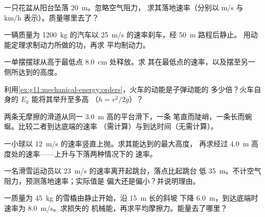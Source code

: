 \begin{exercise}[$\star$]\label{exo:g11:mechanical-energy:3}
一只花盆从阳台坠落 \qty{20}{m}。忽略空气阻力，
求其落地速率（分别以 \unit{m/s} 与 \unit{km/h} 表示）。质量哪里去了？
\end{exercise}

\begin{exercise}[$\star$]\label{exo:g11:mechanical-energy:4}
一辆质量为 \qty{1200}{kg} 的汽车以 \qty{25}{m/s} 的速率刹车，经 \qty{50}{m} 路程后静止。
用动能定理求制动力所做的功，再求
平均制动力。
\end{exercise}

\begin{exercise}[$\star$]\label{exo:g11:mechanical-energy:5}
一单摆摆球从高于最低点 \qty{8.0}{cm} 处释放。求
其在最低点的速率，以及摆至另一侧所达到的高度。
\end{exercise}

\begin{exercise}[$\star\star$]\label{exo:g11:mechanical-energy:6}
利用\cref{ex:g11:mechanical-energy:orders}，火车的动能是子弹动能的
多少倍？火车自身的 $E_k$ 能将其举升至多高
（$h = v^2/2g$）？
\end{exercise}

\begin{exercise}[$\star\star$]\label{exo:g11:mechanical-energy:7}
两条无摩擦的滑道从同一 \qty{3.0}{m} 高的平台滑下，一条
笔直而陡峭，一条长而蜿蜒。比较二者到达底端的速率
（需计算）与到达时间（无需计算）。
\end{exercise}

\begin{exercise}[$\star\star$]\label{exo:g11:mechanical-energy:8}
一小球以 \qty{12}{m/s} 的速率竖直上抛。求其能达到的最大高度，
再求经过 \qty{4.0}{m} 高度处的速率——上升与下落两种情况下的
速率。
\end{exercise}

\begin{exercise}[$\star\star$]\label{exo:g11:mechanical-energy:9}
一名滑雪运动员以 \qty{23}{m/s} 的速率离开起跳台，落点比起跳台
低 \qty{35}{m}。不计空气阻力，预测落地速率；实际值是
偏大还是偏小？并说明理由。
\end{exercise}

\begin{exercise}[$\star\star$]\label{exo:g11:mechanical-energy:10}
一质量为 \qty{45}{kg} 的雪橇由静止开始，沿 \qty{15}{m} 长的斜坡
下降 \qty{6.0}{m}，到达底端时速率为 \qty{8.0}{m/s}。求损失的
机械能，再求平均摩擦力。能量去了哪里？
\end{exercise}

